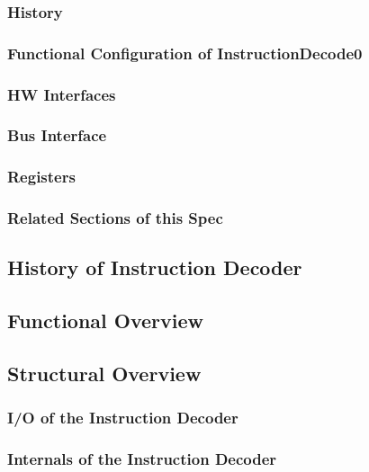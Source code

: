 \subsubsection{History}


\subsubsection{Functional Configuration of InstructionDecode0}


\subsubsection{HW Interfaces}


\subsubsection{Bus Interface}

\subsubsection{Registers}

\subsubsection{Related Sections of this Spec}

\subsection{History of Instruction Decoder}

\subsection{Functional Overview}
\label{subsec:decfunc01}

\subsection{Structural Overview}
\subsubsection{I/O of the Instruction Decoder}

\subsubsection{Internals of the Instruction Decoder}

